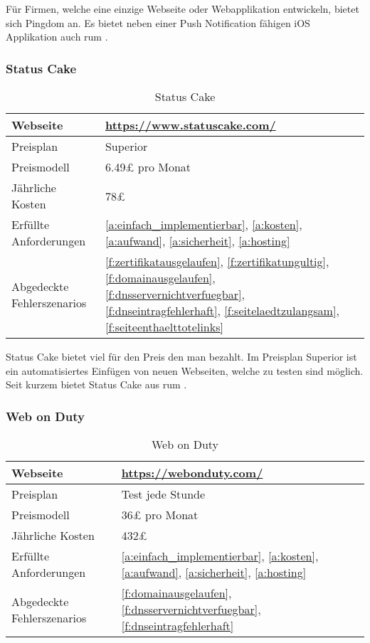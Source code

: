Für Firmen, welche eine einzige Webseite oder Webapplikation entwickeln, bietet sich Pingdom an. Es bietet neben einer Push Notification fähigen iOS Applikation auch \acrlong{rum} .

\subsubsection{Status Cake}
\label{ssub:status_cake}

\begin{table}[H]
  \centering
  \begin{tabular}{p{5cm} p{7cm}}
  \toprule
    Webseite & \url{https://www.statuscake.com/}\\
  \hline
    Preisplan & Superior\\
  \hline
    Preismodell & 6.49£ pro Monat\\
  \hline
    Jährliche Kosten & 78£\\
  \hline
    Erfüllte Anforderungen & \ref{a:einfach_implementierbar}, \ref{a:kosten}, \ref{a:aufwand}, \ref{a:sicherheit}, \ref{a:hosting}\\
  \hline
    Abgedeckte Fehlerszenarios & \ref{f:zertifikatausgelaufen}, \ref{f:zertifikatungultig}, \ref{f:domainausgelaufen}, \ref{f:dnsservernichtverfuegbar}, \ref{f:dnseintragfehlerhaft}, \ref{f:seitelaedtzulangsam}, \ref{f:seiteenthaelttotelinks}\\
  \bottomrule
  \end{tabular}
  \caption{Status Cake}
  \label{tab:status_cake}
\end{table}

Status Cake bietet viel für den Preis den man bezahlt. Im Preisplan Superior ist ein automatisiertes Einfügen von neuen Webseiten, welche zu testen sind möglich. Seit kurzem bietet Status Cake aus \acrlong{rum} .

\subsubsection{Web on Duty}
\label{ssub:web_on_duty}

\begin{table}[H]
  \centering
  \begin{tabular}{p{5cm} p{7cm}}
  \toprule
    Webseite & \url{https://webonduty.com/}\\
  \hline
    Preisplan & Test jede Stunde\\
  \hline
    Preismodell & 36£ pro Monat\\
  \hline
    Jährliche Kosten & 432£\\
  \hline
    Erfüllte Anforderungen & \ref{a:einfach_implementierbar}, \ref{a:kosten}, \ref{a:aufwand}, \ref{a:sicherheit}, \ref{a:hosting}\\
  \hline
    Abgedeckte Fehlerszenarios & \ref{f:domainausgelaufen}, \ref{f:dnsservernichtverfuegbar}, \ref{f:dnseintragfehlerhaft}\\
  \bottomrule
  \end{tabular}
  \caption{Web on Duty}
  \label{tab:web_on_duty}
\end{table}

